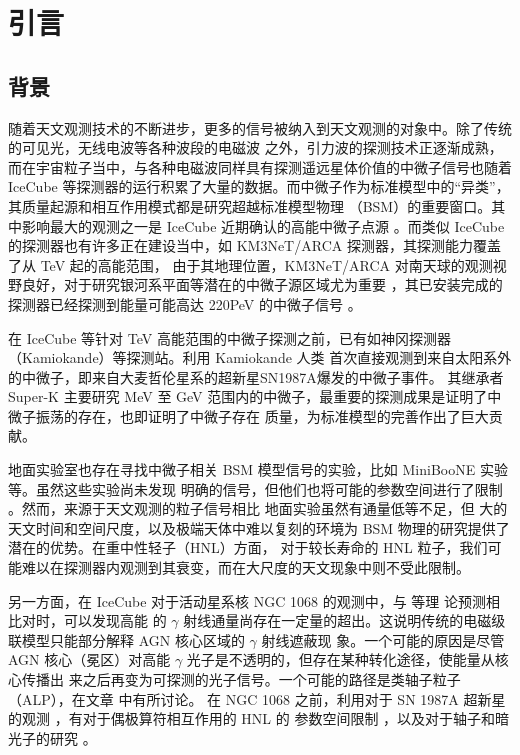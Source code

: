 \documentclass[printMode=false, declarePage=false]{ecnuthesis}
\begin{document}
\mainmatter

\chapter{引言}

\section{背景}

随着天文观测技术的不断进步，更多的信号被纳入到天文观测的对象中。除了传统的可见光，无线电波等各种波段的电磁波
之外，引力波的探测技术正逐渐成熟，而在宇宙粒子当中，与各种电磁波同样具有探测遥远星体价值的中微子信号也随着 IceCube
等探测器的运行积累了大量的数据。而中微子作为标准模型中的“异类”，其质量起源和相互作用模式都是研究超越标准模型物理
（BSM）的重要窗口。其中影响最大的观测之一是 IceCube 近期确认的高能中微子点源 \cite{icecube2022evidence}。而类似
IceCube 的探测器也有许多正在建设当中，如 KM3NeT/ARCA 探测器，其探测能力覆盖了从 TeV 起的高能范围，
由于其地理位置，KM3NeT/ARCA 对南天球的观测视野良好，对于研究银河系平面等潜在的中微子源区域尤为重要
\cite{km3net2024astronomy}，其已安装完成的探测器已经探测到能量可能高达 220PeV 的中微子信号
\cite{km3net2025observation}。

在 IceCube 等针对 TeV 高能范围的中微子探测之前，已有如神冈探测器（Kamiokande）等探测站。利用 Kamiokande 人类
首次直接观测到来自太阳系外的中微子，即来自大麦哲伦星系的超新星SN1987A爆发的中微子事件\cite{hirata1988observation}。
其继承者 Super-K 主要研究 MeV 至 GeV 范围内的中微子，最重要的探测成果是证明了中微子振荡的存在，也即证明了中微子存在
质量，为标准模型的完善作出了巨大贡献\cite{fukuda1998evidence}。

地面实验室也存在寻找中微子相关 BSM 模型信号的实验，比如 MiniBooNE 实验 \cite{PhysRevLett.103.241802}
等。虽然这些实验尚未发现
明确的信号，但他们也将可能的参数空间进行了限制 \cite{bryman2019constraints}。然而，来源于天文观测的粒子信号相比
地面实验虽然有通量低等不足，但
大的天文时间和空间尺度，以及极端天体中难以复刻的环境为 BSM 物理的研究提供了潜在的优势。在重中性轻子（HNL）方面，
对于较长寿命的 HNL 粒子，我们可能难以在探测器内观测到其衰变，而在大尺度的天文现象中则不受此限制。

另一方面，在 IceCube 对于活动星系核 NGC 1068 的观测中，与 \parencite{murase2020hidden} 等理
论预测相比对时，可以发现高能
的 $\gamma$ 射线通量尚存在一定量的超出。这说明传统的电磁级联模型只能部分解释 AGN 核心区域的 $\gamma$ 射线遮蔽现
象。一个可能的原因是尽管 AGN 核心（冕区）对高能 $\gamma$ 光子是不透明的，但存在某种转化途径，使能量从核心传播出
来之后再变为可探测的光子信号。一个可能的路径是类轴子粒子（ALP），在文章 \parencite{pant2024constraining} 中有所讨论。
在 NGC 1068 之前，利用对于 SN 1987A 超新星的观测 \cite{PhysRevLett.58.1490}，有对于偶极算符相互作用的 HNL 的
参数空间限制 \cite{Magill_2018}，以及对于轴子和暗光子的研究 \cite{PhysRevD.94.085012} \cite{Chang_2017}。
\end{document}
